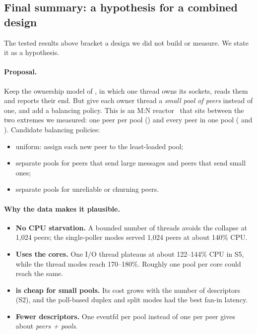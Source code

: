 \subsection{Final summary: a hypothesis for a combined design}

The tested results above bracket a design we did not build or measure. We state it as
a hypothesis.

\paragraph{Proposal.} Keep the ownership model of , in which one
thread owns its sockets, reads them and reports their end. But give each owner thread
a \emph{small pool of peers} instead of one, and add a balancing policy. This is an
M:N reactor~\cite{reactor} that sits between the two extremes we measured: one peer
per pool () and every peer in one pool ( and
). Candidate balancing policies:
\begin{itemize}
  \item uniform: assign each new peer to the least-loaded pool;
  \item separate pools for peers that send large messages and peers that send small
        ones;
  \item separate pools for unreliable or churning peers.
\end{itemize}

\paragraph{Why the data makes it plausible.}
\begin{itemize}
  \item \textbf{No CPU starvation.} A bounded number of threads avoids the collapse
        at 1,024 peers; the single-poller modes served 1,024 peers at about 140\% CPU.
  \item \textbf{Uses the cores.} One I/O thread plateaus at about 122--144\% CPU in
        S5, while the thread modes reach 170--180\%. Roughly one pool per core could
        reach the same.
  \item \textbf{ is cheap for small pools.} Its cost grows with the number
        of descriptors (S2), and the poll-based duplex and split modes had the best
        fan-in latency.
  \item \textbf{Fewer descriptors.} One eventfd per pool instead of one per peer gives
        about \emph{peers + pools}.
\end{itemize}

